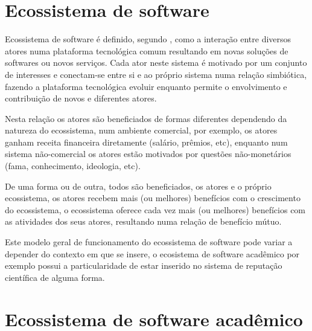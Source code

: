 \section{Ecossistema de software}


Ecossistema de software é definido, segundo ,
como a interação entre diversos atores numa plataforma tecnológica comum
resultando em novas soluções de softwares ou novos serviços. Cada ator neste
sistema é motivado por um conjunto de interesses e conectam-se entre si e ao
próprio sistema numa relação simbiótica, fazendo a plataforma tecnológica
evoluir enquanto permite o envolvimento e contribuição de novos e diferentes
atores.

Nesta relação os atores são beneficiados de formas diferentes dependendo da
natureza do ecossistema, num ambiente comercial, por exemplo, os atores ganham
receita financeira diretamente (salário, prêmios, etc), enquanto num sistema
não-comercial os atores estão motivados por questões não-monetários (fama,
conhecimento, ideologia, etc).

De uma forma ou de outra, todos são beneficiados, os atores e o próprio
ecossistema, os atores recebem mais (ou melhores) benefícios com o crescimento
do ecossistema, o ecossistema oferece cada vez mais (ou melhores) benefícios
com as atividades dos seus atores, resultando numa relação de benefício
mútuo.

Este modelo geral de funcionamento do ecossistema de software pode variar a
depender do contexto em que se insere, o ecosistema de software acadêmico por
exemplo possui a particularidade de estar inserido no sistema de reputação
científica de alguma forma.

%
%
%

\section{Ecossistema de software acadêmico}

